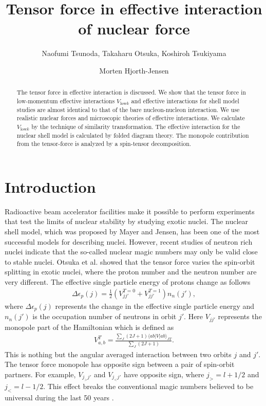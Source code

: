 \documentclass[a4paper]{jpconf}
\newcommand\Vlowk{V_{\mathrm{low}k}}
\def\bra#1{\langle #1 \rvert}
\def\ket#1{\lvert #1 \rangle}
\begin{document}
\title{Tensor force in effective interaction of nuclear force}

\author{Naofumi Tsunoda, Takaharu Otsuka, Koshiroh Tsukiyama}

\address{Department of physics, the University of Tokyo, 7-3-1 Hongo,
Bunkyo-ku, Tokyo, Japan}

\author{Morten Hjorth-Jensen}
\address{Department of Physics and Center of Mathematics for Applications, University of Oslo, N-0316 Oslo, Norway}

\begin{abstract}
The tensor force in effective interaction is discussed.
We show that the tensor force in low-momentum effective interactions
 $\Vlowk$ and effective interactions for shell model studies are almost identical
 to that of the bare nucleon-nucleon interaction.
We use realistic nuclear forces and microscopic theories of effective interactions.
We calculate $\Vlowk$ by the technique of similarity transformation. The
 effective interaction for the nuclear shell model is calculated by folded
 diagram theory.
The monopole contribution from the tensor-force is analyzed by a spin-tensor decomposition.
\end{abstract}

 \section{Introduction}

 Radioactive beam accelerator facilities  make it possible to perform experiments 
that test the limits of nuclear stability by studying exotic nuclei.
The  nuclear shell model, which was proposed by Mayer and Jensen, 
 has been one of the most successful models for describing nuclei.
 However, recent studies of neutron rich nuclei indicate that the so-called nuclear magic
 numbers may only be  valid close to stable nuclei.
 Otsuka et al. showed that the tensor force varies the spin-orbit splitting in exotic
 nuclei, where the  proton number and the neutron number are very different.
 The effective single particle energy of protons change as follows
  \begin{align}
   \label{eq:ESPE}
   \Delta \epsilon_p(j)=\frac{1}{2}
   \left(V_{jj'}^{T=0}+V_{jj'}^{T=1}\right)
   n_n(j'),
  \end{align}
  where $\Delta \epsilon_p(j)$ represents the  change in the  effective single
  particle energy and $n_n(j')$ is the occupation number of neutrons in orbit
  $j'$.
 Here $V_{jj'}$ represents the 
 monopole part of the Hamiltonian which is defined as 
 \begin{eqnarray}
  V_{a,b}^T=\frac{\sum_{J}(2J+1) \bra{ab} V \ket{ab}_{JT}}{\sum_{J} (2J+1)}.
 \end{eqnarray}
 This is nothing but the angular averaged interaction between two orbits
 $j$ and $j'$.
The  tensor force monopole has opposite sign between
  a pair of spin-orbit partners. For example, $V_{j_{>}j'}$ and
  $V_{j_{<}j'}$ have opposite sign, where $j_{>}=l + 1/2$ and $j_{<} = l
  -1/2$.
  This effect breaks the conventional magic numbers believed to be
  universal during the last  50 years \cite{PhysRevLett.95.232502}.
  
\end{document}
